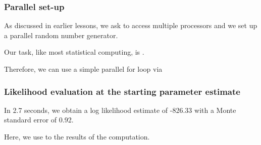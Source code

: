 \begin{frame}[fragile]

\frametitle{Parallel set-up}

\bi
\item
As discussed in earlier lessons, we ask {\Rlanguage} to access multiple processors and we set up a parallel random number generator.
\ei

\begin{knitrout}\small
{}\color{fgcolor}\begin{kframe}
\begin{alltt}
\hlstd{(}\hlstd{())}
\hlstd{(}\hlstd{)}
\end{alltt}
\end{kframe}
\end{knitrout}

\bi
\item Our task, like most statistical computing, is .
\item Therefore, we can use a simple parallel for loop via 
\ei
\end{frame}


\begin{frame}[fragile]

\frametitle{Likelihood evaluation at the starting parameter estimate}


\begin{knitrout}\small
{}\color{fgcolor}
\end{knitrout}

\bi

\item In  2.7 seconds, we obtain a log likelihood estimate of -826.33 with a Monte standard error of 0.92.

\item Here, we use  to  the results of the computation.
\ei

\end{frame}

